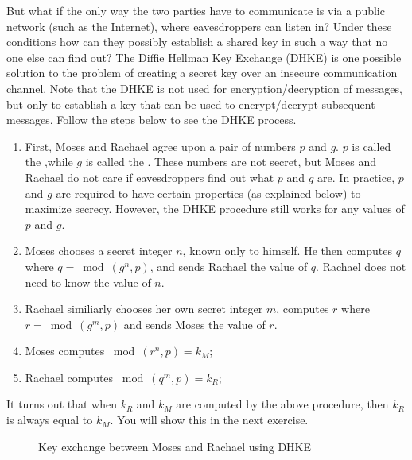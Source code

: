  But what if the only way the two parties have to communicate is via a public network (such as the Internet), where eavesdroppers can listen in?  Under these conditions how can they possibly establish a shared key in such a way that no one else can find out?  The Diffie Hellman Key Exchange (DHKE) is one possible solution to the problem of creating a secret key over an insecure communication channel.  Note that the DHKE is not used for encryption/decryption of messages, but only to establish a key that can be used to encrypt/decrypt subsequent messages.  Follow the steps below to see the DHKE process.  

 \begin{enumerate}[Step 1.]
 \item First, Moses and Rachael agree upon a pair of numbers $p$ and $g$. $p$ is called the ,while $g$ is called the . These numbers are not secret, but Moses and Rachael do not care if eavesdroppers find out what $p$ and $g$ are. In practice, $p$ and $g$ are required to have certain properties (as explained below) to maximize secrecy.  However, the DHKE procedure still works for any values of $p$ and $g$.
\item Moses chooses a secret integer $n$, known only to himself.  He then computes $q$ where $q =\bmod(g^n,p)$, and sends Rachael the value of $q$. Rachael does not need to know the value of $n$.
\item Rachael similiarly chooses her own secret integer $m$, computes $r$ where $r =\bmod(g^m,p)$ and sends Moses the value of $r$.
\item Moses computes $ \bmod (r^n , p ) = k_M$;
\item Rachael computes $ \bmod (q^m , p ) = k_R$;
\end{enumerate} 
It turns out that when $k_R$ and $k_M$ are computed by the above procedure, then $k_R$ is always equal to $k_M$.  You will show this in the next exercise.  
\begin{figure}[htb]
	  \caption{\label{fig:DH:DHKE_1} Key exchange between Moses and Rachael using DHKE}
\end{figure}

